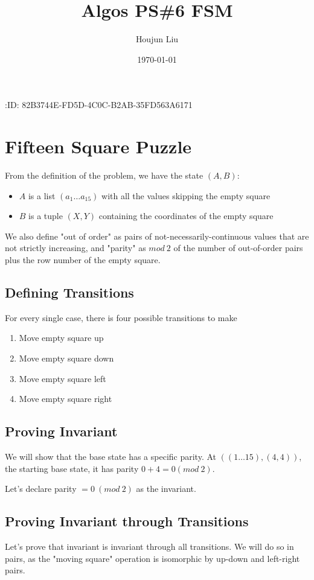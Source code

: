 \documentclass[letterpaper]{article}
\author{Houjun Liu}
\date{\today}
\title{Algos PS\#6 FSM}
\renewcommand{\tableofcontents}{}
\begin{document}
\tableofcontents

:ID:       82B3744E-FD5D-4C0C-B2AB-35FD563A6171

\section{Fifteen Square Puzzle}
\label{sec:org2b0e5d7}
From the definition of the problem, we have the state \((A,B)\):

\begin{itemize}
\item \(A\) is a list \((a_1\ldots a_{15})\) with all the values skipping the empty square
\item \(B\) is a tuple \((X,Y)\) containing the coordinates of the empty square
\end{itemize}

We also define "out of order" as pairs of not-necessarily-continuous values that are not strictly increasing, and "parity" as \(mod\ 2\) of the number of out-of-order pairs plus the row number of the empty square.

\subsection{Defining Transitions}
\label{sec:orgbc03a26}
For every single case, there is four possible transitions to make

\begin{enumerate}
\item Move empty square up
\item Move empty square down
\item Move empty square left
\item Move empty square right
\end{enumerate}

\subsection{Proving Invariant}
\label{sec:org3b7fcff}
We will show that the base state has a specific parity. At \(((1\ldots 15), (4,4))\), the starting base state, it has parity \(0 + 4 = 0 (mod\ 2)\).

Let's declare parity \(=0\ (mod\ 2)\) as the invariant.

\subsection{Proving Invariant through Transitions}
\label{sec:orgb513b25}
Let's prove that invariant is invariant through all transitions. We will do so in pairs, as the "moving square" operation is isomorphic by up-down and left-right pairs.
\end{document}
